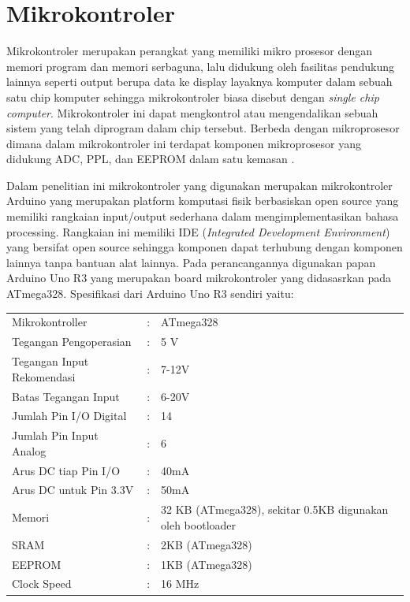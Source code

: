 \section{Mikrokontroler}
Mikrokontroler merupakan perangkat yang memiliki mikro prosesor dengan memori program dan memori
serbaguna, lalu didukung oleh fasilitas pendukung lainnya seperti output berupa data ke display
layaknya komputer dalam sebuah satu chip komputer sehingga mikrokontroler biasa disebut dengan
\textit{single chip computer}. Mikrokontroler ini dapat mengkontrol atau mengendalikan sebuah sistem
yang telah diprogram dalam chip tersebut. Berbeda dengan mikroprosesor dimana dalam mikrokontroler
ini terdapat komponen mikroprosesor yang didukung ADC, PPL, dan EEPROM dalam satu kemasan
\cite{Sokop2016}.

Dalam penelitian ini mikrokontroler yang digunakan merupakan mikrokontroler Arduino yang merupakan
platform komputasi fisik berbasiskan open source yang memiliki rangkaian input/output sederhana
dalam mengimplementasikan bahasa processing. Rangkaian ini memiliki IDE (\textit{Integrated 
Development Environment}) yang bersifat open source sehingga komponen dapat terhubung dengan
komponen lainnya tanpa bantuan alat lainnya. Pada perancangannya digunakan papan Arduino Uno R3
yang merupakan board mikrokontroler yang didasasrkan pada ATmega328\cite{Sokop2016}. Spesifikasi
dari Arduino Uno R3 sendiri yaitu:
\begin{longtable}{p{6cm}p{3pt}p{6cm}}
    \hspace{20pt} Mikrokontroller &:& ATmega328\\
    \hspace{20pt} Tegangan Pengoperasian &:&5 V\\
    \hspace{20pt} Tegangan Input Rekomendasi &:& 7-12V\\
    \hspace{20pt} Batas Tegangan Input &:& 6-20V\\
    \hspace{20pt} Jumlah Pin I/O Digital &:& 14\\
    \hspace{20pt} Jumlah Pin Input Analog &:& 6\\
    \hspace{20pt} Arus DC tiap Pin I/O &:& 40mA\\
    \hspace{20pt} Arus DC untuk Pin 3.3V &:& 50mA\\
    \hspace{20pt} Memori &:& 32 KB (ATmega328), sekitar 0.5KB digunakan oleh bootloader\\
    \hspace{20pt} SRAM &:& 2KB (ATmega328)\\
    \hspace{20pt} EEPROM &:& 1KB (ATmega328)\\
    \hspace{20pt} Clock Speed &:& 16 MHz
\end{longtable}

